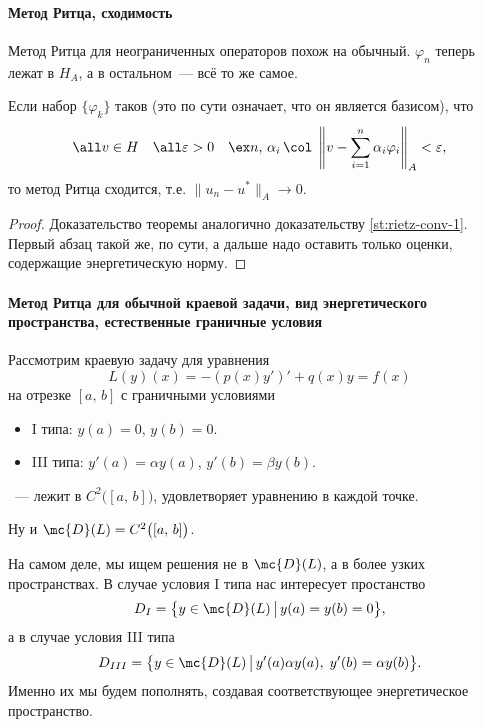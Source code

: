 \documentclass{trlnotes}
\begin{document}
    \paragraph{Метод Ритца, сходимость}

    Метод Ритца для неограниченных операторов похож на обычный. $\varphi_n$ теперь лежат в $H_A$, а в остальном~--- всё то же самое.

    \begin{thm}
        Если набор $\{\varphi_k\}$ таков (это по сути означает, что он является базисом), что
        \[
            \all v \in H \quad \all \varepsilon > 0 \quad \ex n, \, \alpha_i \, \col \; \left\|v - \sum\limits_{i = 1}^n \alpha_i \varphi_i \right\|_A < \varepsilon,
        \]
        то метод Ритца сходится, т.е. $\|u_n - u^*\|_A \to 0$.
        \begin{proof}
            Доказательство теоремы аналогично доказательству \ref{st:rietz-conv-1}. Первый абзац такой же, по сути, а дальше надо оставить только оценки, содержащие энергетическую норму.
        \end{proof}
    \end{thm}

    \paragraph{Метод Ритца для обычной краевой задачи, вид энергетического пространства, естественные граничные условия}

    Рассмотрим краевую задачу для уравнения 
    \[
        L(y)(x) = -(p(x)y')' + q(x)y = f(x)
    \]
    на отрезке $[a, \, b]$ с граничными условиями
    \begin{itemize}
        \item I типа: $y(a) = 0$, $y(b) = 0$.
        \item III типа: $y'(a) = \alpha y(a)$, $y'(b) = \beta y(b)$.
    \end{itemize}

    \begin{de}
        ~--- лежит в $C^2\big([a, \, b]\big)$, удовлетворяет уравнению в каждой точке. 
    \end{de}

    Ну и $\mc{D}(L) = C^2\big([a, \, b]\big)$. 

    \begin{rem}
        На самом деле, мы ищем решения не в $\mc{D}(L)$, а в более узких пространствах. В случае условия I типа нас интересует простанство
        \[
            D_{I} = \big\{y \in \mc{D}(L) \, \big| \, y(a) = y(b) = 0\big\},
        \]
        а в случае условия III типа
        \[
            D_{III} = \big\{y \in \mc{D}(L) \, \big| \, y'(a)\alpha y(a), \; y'(b) = \alpha y(b)\big\}.
        \]
        Именно их мы будем пополнять, создавая соответствующее энергетическое пространство.
    \end{rem}
\end{document}
